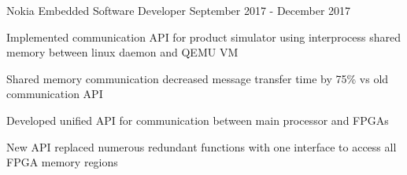 

\begin{cventries}

  \cventry
    {Nokia} %
    {Embedded Software Developer} %
    {September 2017 - December 2017} %
    {}
    {
      \begin{cvitems} %
        \item {Implemented communication API for product simulator using interprocess shared memory between linux daemon and QEMU VM}
        \item {Shared memory communication decreased message transfer time by 75\% vs old communication API}
        \item {Developed unified API for communication between main processor and FPGAs}
        \item {New API replaced numerous redundant functions with one interface to access all FPGA memory regions}
      \end{cvitems}
    }


\end{cventries}
